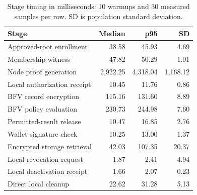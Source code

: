 \begin{table}[t]
\centering\scriptsize
\caption{Stage timing in milliseconds: 10 warmups and 30 measured samples per row. SD is population standard deviation.}
\label{tab:timings}
\setlength{\tabcolsep}{3pt}\renewcommand{\arraystretch}{1.1}
\begin{tabularx}{\columnwidth}{>{\raggedright\arraybackslash}Xrrr}
\toprule Stage & Median & p95 & SD\\\midrule
Approved-root enrollment & 38.58 & 45.93 & 4.69\\
Membership witness & 47.82 & 50.29 & 1.01\\
Node proof generation & 2,922.25 & 4,318.04 & 1,168.12\\
Local authorization receipt & 10.45 & 11.76 & 0.86\\
BFV record encryption & 115.16 & 131.60 & 8.89\\
BFV policy evaluation & 230.73 & 244.98 & 7.60\\
Permitted-result release & 10.47 & 16.85 & 2.76\\
Wallet-signature check & 10.25 & 13.00 & 1.37\\
Encrypted storage retrieval & 42.03 & 107.35 & 20.37\\
Local revocation request & 1.87 & 2.41 & 4.94\\
Local deactivation receipt & 1.66 & 2.07 & 0.23\\
Direct local cleanup & 22.62 & 31.28 & 5.13\\
\bottomrule\end{tabularx}
\end{table}

